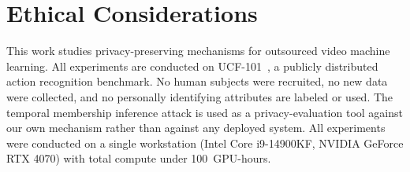 \documentclass[letterpaper]{article} %
\begin{document}
\section{Ethical Considerations}
\label{app:ethics}

This work studies privacy-preserving mechanisms for outsourced video machine learning. All experiments are conducted on UCF-101~\cite{soomro2012ucf101}, a publicly distributed action recognition benchmark. No human subjects were recruited, no new data were collected, and no personally identifying attributes are labeled or used. The temporal membership inference attack is used as a privacy-evaluation tool against our own mechanism rather than against any deployed system. All experiments were conducted on a single workstation (Intel Core i9-14900KF, NVIDIA GeForce RTX 4070) with total compute under 100~GPU-hours.


\end{document}
